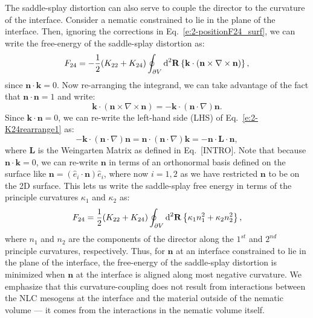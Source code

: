 The saddle-splay distortion can also serve to couple the director to the curvature of the interface.
Consider a nematic constrained to lie in the plane of the interface.
Then, ignoring the corrections in Eq.~\ref{e:2-positionF24_surf}, we can write the free-energy of the saddle-splay distortion as:
\begin{equation}
  F_{24} = -\frac{1}{2}(K_{22} + K_{24})
  \oint_{\partial V}\textup{d}^2 \mathbf{R} \left \{\mathbf{k} \cdot ( \mathbf{n} \times \nabla \times \mathbf{n}) \right \},\label{e:2-K24PlanDegen}
\end{equation}
since $\mathbf{n} \cdot \mathbf{k} = 0$. Now re-arranging the integrand, we can take advantage of the fact that $\mathbf{n} \cdot \mathbf{n}=1$ and write:
\begin{equation}
  \mathbf{k} \cdot ( \mathbf{n} \times \nabla \times \mathbf{n}) = -\mathbf{k} \cdot (\mathbf{n} \cdot \nabla)\mathbf{n}.\label{e:2-K24rearrange1}
\end{equation}
Since $\mathbf{k} \cdot \mathbf{n} = 0$, we can re-write the left-hand side (LHS) of Eq.~\ref{e:2-K24rearrange1} as:
\begin{equation}
  -\mathbf{k} \cdot (\mathbf{n} \cdot \nabla)\mathbf{n} = \mathbf{n} \cdot (\mathbf{n} \cdot \nabla)\mathbf{k} = -\mathbf{n} \cdot \mathbf{L} \cdot \mathbf{n},\label{e:2-K24rearrange2}
\end{equation}
where $\mathbf{L}$ is the Weingarten Matrix as defined in Eq.~[INTRO].
Note that because $\mathbf{n} \cdot \mathbf{k}=0$, we can re-write $\mathbf{n}$ in terms of an orthonormal basis defined on the surface like $\mathbf{n} = (\hat{e}_i \cdot \mathbf{n})\hat{e}_i$, where now $i = 1,2$ as we have restricted $\mathbf{n}$ to be on the 2D surface.
This lets us write the saddle-splay free energy in terms of the principle curvatures $\kappa_1$ and $\kappa_2$ as:
\begin{equation}
  F_{24} = \frac{1}{2}(K_{22} + K_{24})
  \oint_{\partial V}\textup{d}^2 \mathbf{R} \left \{\kappa_1 n_1^2 + \kappa_2 n_2^2 \right \},\label{e:2-K24SurfCouple}
\end{equation}
where $n_1$ and $n_2$ are the components of the director along the $1^{st}$ and $2^{nd}$ principle curvatures, respectively.
Thus, for $\mathbf{n}$ at an interface constrained to lie in the plane of  the interface, the free-energy of the saddle-splay distortion is minimized when $\mathbf{n}$ at the interface is aligned along most negative curvature.
We emphasize that this curvature-coupling does not result from interactions between the NLC mesogens at the interface and the material outside of the nematic volume --- it comes from the interactions in the nematic volume itself.




